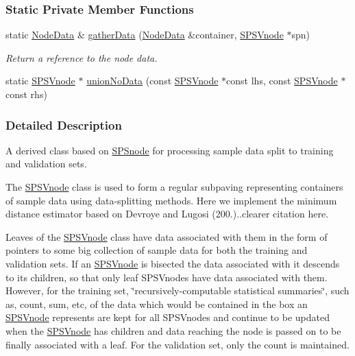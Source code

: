\subsubsection*{\-Static \-Private \-Member \-Functions}
\begin{DoxyCompactItemize}
\item 
static \hyperlink{namespacesubpavings_af005697b49cff9ea37fc3bc9ed19da30}{\-Node\-Data} \& \hyperlink{classsubpavings_1_1SPSVnode_ad9b78707e372d9b66876e6afa0cb8eb1}{gather\-Data} (\hyperlink{namespacesubpavings_af005697b49cff9ea37fc3bc9ed19da30}{\-Node\-Data} \&container, \hyperlink{classsubpavings_1_1SPSVnode}{\-S\-P\-S\-Vnode} $\ast$spn)
\begin{DoxyCompactList}\small\item\em \-Return a reference to the node data. \end{DoxyCompactList}\item 
static \hyperlink{classsubpavings_1_1SPSVnode}{\-S\-P\-S\-Vnode} $\ast$ \hyperlink{classsubpavings_1_1SPSVnode_ab79e2b1aa783e2df56abf8279c5dc564}{union\-No\-Data} (const \hyperlink{classsubpavings_1_1SPSVnode}{\-S\-P\-S\-Vnode} $\ast$const lhs, const \hyperlink{classsubpavings_1_1SPSVnode}{\-S\-P\-S\-Vnode} $\ast$const rhs)
\end{DoxyCompactItemize}


\subsubsection{\-Detailed \-Description}
\-A derived class based on \hyperlink{classsubpavings_1_1SPSnode}{\-S\-P\-Snode} for processing sample data split to training and validation sets. 

\-The \hyperlink{classsubpavings_1_1SPSVnode}{\-S\-P\-S\-Vnode} class is used to form a regular subpaving representing containers of sample data using data-\/splitting methods. \-Here we implement the minimum distance estimator based on \-Devroye and \-Lugosi (200.)..clearer citation here.

\-Leaves of the \hyperlink{classsubpavings_1_1SPSVnode}{\-S\-P\-S\-Vnode} class have data associated with them in the form of pointers to some big collection of sample data for both the training and validation sets. \-If an \hyperlink{classsubpavings_1_1SPSVnode}{\-S\-P\-S\-Vnode} is bisected the data associated with it descends to its children, so that only leaf \-S\-P\-S\-Vnodes have data associated with them. \-However, for the training set, \char`\"{}recursively-\/computable statistical summaries\char`\"{}, such as, count, sum, etc, of the data which would be contained in the box an \hyperlink{classsubpavings_1_1SPSVnode}{\-S\-P\-S\-Vnode} represents are kept for all \-S\-P\-S\-Vnodes and continue to be updated when the \hyperlink{classsubpavings_1_1SPSVnode}{\-S\-P\-S\-Vnode} has children and data reaching the node is passed on to be finally associated with a leaf. \-For the validation set, only the count is maintained.

